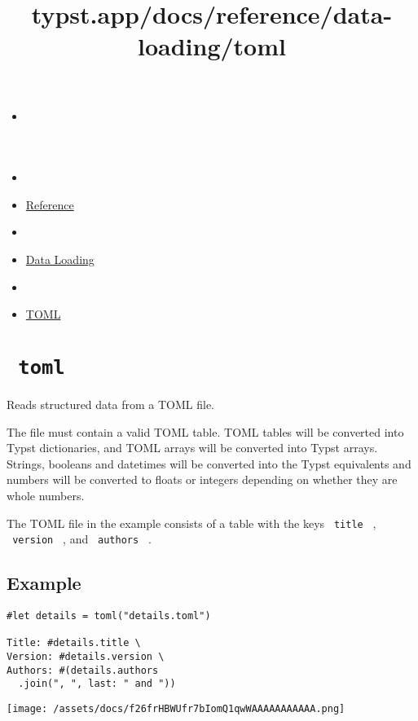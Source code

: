 \title{typst.app/docs/reference/data-loading/toml}

\begin{itemize}
\tightlist
\item
  \href{/docs}{}
\item
  
\item
  \href{/docs/reference/}{Reference}
\item
  
\item
  \href{/docs/reference/data-loading/}{Data Loading}
\item
  
\item
  \href{/docs/reference/data-loading/toml/}{TOML}
\end{itemize}

\section{\texorpdfstring{\texttt{\ toml\ }}{ toml }}\label{summary}

Reads structured data from a TOML file.

The file must contain a valid TOML table. TOML tables will be converted
into Typst dictionaries, and TOML arrays will be converted into Typst
arrays. Strings, booleans and datetimes will be converted into the Typst
equivalents and numbers will be converted to floats or integers
depending on whether they are whole numbers.

The TOML file in the example consists of a table with the keys
\texttt{\ title\ } , \texttt{\ version\ } , and \texttt{\ authors\ } .

\subsection{Example}\label{example}

\begin{verbatim}
#let details = toml("details.toml")

Title: #details.title \
Version: #details.version \
Authors: #(details.authors
  .join(", ", last: " and "))
\end{verbatim}

\texttt{[image: /assets/docs/f26frHBWUfr7bIomQ1qwWAAAAAAAAAAA.png]}

